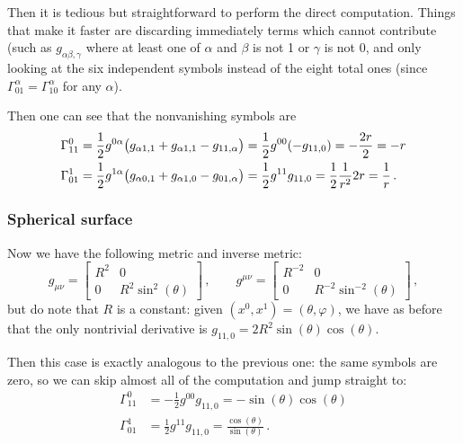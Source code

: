 \documentclass[main.tex]{subfiles}
\begin{document}
Then it is tedious but straightforward to perform the direct computation.
Things that make it faster are discarding immediately terms which cannot contribute (such as \(g_{\alpha \beta ,\gamma }\) where at least one of \(\alpha \) and \(\beta \) is not 1 or \(\gamma \) is not \(0\), and only looking at the six independent symbols instead of the eight total ones (since \(\Gamma^{\alpha }_{01} = \Gamma^{\alpha }_{10}\) for any \(\alpha \)).

Then one can see that the nonvanishing symbols are
%
\begin{subequations}
\begin{align}
  \Gamma^{0}_{11} &= \frac{1}{2} g^{0\alpha}\qty(g_{\alpha 1, 1}  + g_{\alpha 1, 1} - g_{11, \alpha }) 
  = \frac{1}{2} g^{00}(-g_{11, 0}) = - \frac{2r}{2} = -r  \\
  \Gamma^{1}_{01} &= \frac{1}{2} g^{1 \alpha }\qty(g_{\alpha 0, 1} + g_{\alpha 1, 0} - g_{01, \alpha })
  = \frac{1}{2} g^{11} g_{11, 0} = \frac{1}{2} \frac{1}{r^2} 2r = \frac{1}{r}
\,.
\end{align}
\end{subequations}
%

\subsubsection{Spherical surface} \label{sec:spherical-surface-curvature}

Now we have the following metric and inverse metric: 
%
\begin{equation} \label{eq:spherical-metric} 
  g_{\mu \nu } = \left[\begin{array}{cc}
  R^2 & 0 \\ 
  0 & R^2 \sin^2(\theta ) 
  \end{array}\right]\,,
  \qquad
  g^{\mu \nu } = \left[\begin{array}{cc}
  R^{-2} & 0 \\ 
  0 & R^{-2}\sin^{-2}(\theta ) 
  \end{array}\right]
\,,
\end{equation}
%
but do note that \(R\) is a constant: given \((x^{0}, x^{1}) = (\theta, \varphi)\), we have as before that the only nontrivial derivative is \(g_{11,0} = 2 R^2  \sin(\theta ) \cos(\theta) \).

Then this case is exactly analogous to the previous one: the same symbols are zero, so we can skip almost all of the computation and jump straight to: 
%
\begin{subequations} \label{eq:spherical-christoffel} 
\begin{align}
  \Gamma^{0}_{11} &= -\frac{1}{2} g^{00}g_{11,0} = - \sin(\theta ) \cos(\theta ) \\
  \Gamma^{1}_{01} &= \frac{1}{2} g^{11}g_{11,0} = \frac{\cos(\theta ) } {\sin(\theta ) }
\,.
\end{align}
\end{subequations}
\end{document}
